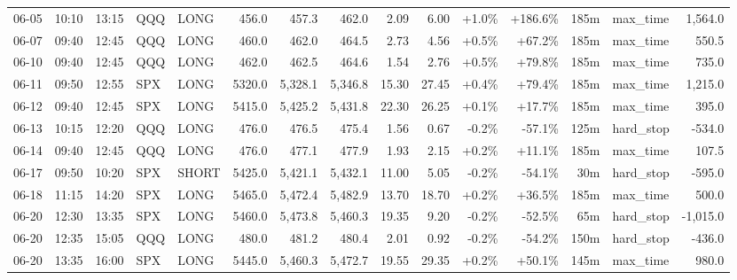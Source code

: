 \documentclass[11pt,a4paper,twoside]{article}
\begin{document}
\begin{landscape}
\begin{center}
\begin{longtable}{>{\color{txtmain}}l l l l l r r r r r r r r >{\color{txtmain}}l r}
06-05 & 10:10 & 13:15 & QQQ & LONG & 456.0 & 457.3 & 462.0 & 2.09 & 6.00 & \textcolor{wingreen}{+1.0\%} & \textcolor{wingreen}{+186.6\%} & 185m & max\_time & \textcolor{wingreen}{1,564.0} \\
06-07 & 09:40 & 12:45 & QQQ & LONG & 460.0 & 462.0 & 464.5 & 2.73 & 4.56 & \textcolor{wingreen}{+0.5\%} & \textcolor{wingreen}{+67.2\%} & 185m & max\_time & \textcolor{wingreen}{550.5} \\
06-10 & 09:40 & 12:45 & QQQ & LONG & 462.0 & 462.5 & 464.6 & 1.54 & 2.76 & \textcolor{wingreen}{+0.5\%} & \textcolor{wingreen}{+79.8\%} & 185m & max\_time & \textcolor{wingreen}{735.0} \\
06-11 & 09:50 & 12:55 & SPX & LONG & 5320.0 & 5,328.1 & 5,346.8 & 15.30 & 27.45 & \textcolor{wingreen}{+0.4\%} & \textcolor{wingreen}{+79.4\%} & 185m & max\_time & \textcolor{wingreen}{1,215.0} \\
06-12 & 09:40 & 12:45 & SPX & LONG & 5415.0 & 5,425.2 & 5,431.8 & 22.30 & 26.25 & \textcolor{wingreen}{+0.1\%} & \textcolor{wingreen}{+17.7\%} & 185m & max\_time & \textcolor{wingreen}{395.0} \\
06-13 & 10:15 & 12:20 & QQQ & LONG & 476.0 & 476.5 & 475.4 & 1.56 & 0.67 & \textcolor{lossred}{-0.2\%} & \textcolor{lossred}{-57.1\%} & 125m & hard\_stop & \textcolor{lossred}{-534.0} \\
06-14 & 09:40 & 12:45 & QQQ & LONG & 476.0 & 477.1 & 477.9 & 1.93 & 2.15 & \textcolor{wingreen}{+0.2\%} & \textcolor{wingreen}{+11.1\%} & 185m & max\_time & \textcolor{wingreen}{107.5} \\
06-17 & 09:50 & 10:20 & SPX & SHORT & 5425.0 & 5,421.1 & 5,432.1 & 11.00 & 5.05 & \textcolor{lossred}{-0.2\%} & \textcolor{lossred}{-54.1\%} & 30m & hard\_stop & \textcolor{lossred}{-595.0} \\
06-18 & 11:15 & 14:20 & SPX & LONG & 5465.0 & 5,472.4 & 5,482.9 & 13.70 & 18.70 & \textcolor{wingreen}{+0.2\%} & \textcolor{wingreen}{+36.5\%} & 185m & max\_time & \textcolor{wingreen}{500.0} \\
06-20 & 12:30 & 13:35 & SPX & LONG & 5460.0 & 5,473.8 & 5,460.3 & 19.35 & 9.20 & \textcolor{lossred}{-0.2\%} & \textcolor{lossred}{-52.5\%} & 65m & hard\_stop & \textcolor{lossred}{-1,015.0} \\
06-20 & 12:35 & 15:05 & QQQ & LONG & 480.0 & 481.2 & 480.4 & 2.01 & 0.92 & \textcolor{lossred}{-0.2\%} & \textcolor{lossred}{-54.2\%} & 150m & hard\_stop & \textcolor{lossred}{-436.0} \\
06-20 & 13:35 & 16:00 & SPX & LONG & 5445.0 & 5,460.3 & 5,472.7 & 19.55 & 29.35 & \textcolor{wingreen}{+0.2\%} & \textcolor{wingreen}{+50.1\%} & 145m & max\_time & \textcolor{wingreen}{980.0} \\

\end{longtable}
\end{center}
\end{landscape}
\end{document}
